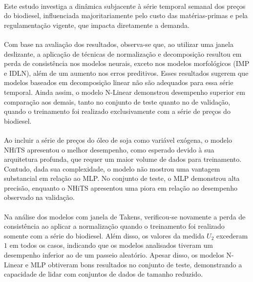\paragraph{}Este estudo investiga a dinâmica subjacente à série temporal semanal dos preços do biodiesel, influenciada majoritariamente pelo custo das matérias-primas e pela regulamentação vigente, que impacta diretamente a demanda.

\paragraph{} Com base na avaliação dos resultados, observa-se que, ao utilizar uma janela deslizante, a aplicação de técnicas de normalização e decomposição resultou em perda de consistência nos modelos neurais, exceto nos modelos morfológicos (\ac{IMP} e \ac{IDLN}), além de um aumento nos erros preditivos. Esses resultados sugerem que modelos baseados em decomposição linear não são adequados para essa série temporal. Ainda assim, o modelo \ac{N-Linear} demonstrou desempenho superior em comparação aos demais, tanto no conjunto de teste quanto no de validação, quando o treinamento foi realizado exclusivamente com a série de preços do biodiesel.

\paragraph{} Ao incluir a série de preços do óleo de soja como variável exógena, o modelo \ac{NHiTS} apresentou o melhor desempenho, como esperado devido à sua arquitetura profunda, que requer um maior volume de dados para treinamento. Contudo, dada sua complexidade, o modelo não mostrou uma vantagem substancial em relação ao \ac{MLP}. No conjunto de teste, o \ac{MLP} demonstrou alta precisão, enquanto o \ac{NHiTS} apresentou uma piora em relação ao desempenho observado na validação.

\paragraph{} Na análise dos modelos com janela de Takens, verificou-se novamente a perda de consistência ao aplicar a normalização quando o treinamento foi realizado somente com a série do biodiesel. Além disso, os valores da medida \(U_2\) excederam \(1\) em todos os casos, indicando que os modelos analisados tiveram um desempenho inferior ao de um passeio aleatório. Apesar disso, os modelos \ac{N-Linear} e \ac{MLP} obtiveram bons resultados no conjunto de teste, demonstrando a capacidade de lidar com conjuntos de dados de tamanho reduzido.

